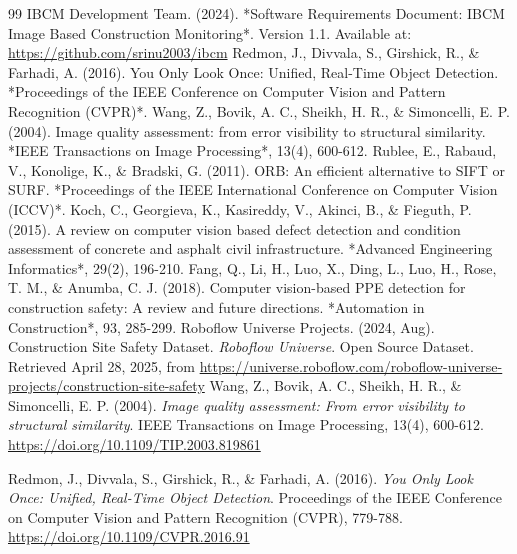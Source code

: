 \documentclass[12pt,a4paper]{report}
\begin{document}
% 
\renewcommand{\bibname}{References} %
\begin{thebibliography}{99}
     IBCM Development Team. (2024). *Software Requirements Document: IBCM Image Based Construction Monitoring*. Version 1.1. Available at: \url{https://github.com/srinu2003/ibcm}
     Redmon, J., Divvala, S., Girshick, R., \& Farhadi, A. (2016). You Only Look Once: Unified, Real-Time Object Detection. *Proceedings of the IEEE Conference on Computer Vision and Pattern Recognition (CVPR)*.
     Wang, Z., Bovik, A. C., Sheikh, H. R., \& Simoncelli, E. P. (2004). Image quality assessment: from error visibility to structural similarity. *IEEE Transactions on Image Processing*, 13(4), 600-612.
     Rublee, E., Rabaud, V., Konolige, K., \& Bradski, G. (2011). ORB: An efficient alternative to SIFT or SURF. *Proceedings of the IEEE International Conference on Computer Vision (ICCV)*.
     Koch, C., Georgieva, K., Kasireddy, V., Akinci, B., \& Fieguth, P. (2015). A review on computer vision based defect detection and condition assessment of concrete and asphalt civil infrastructure. *Advanced Engineering Informatics*, 29(2), 196-210.
     Fang, Q., Li, H., Luo, X., Ding, L., Luo, H., Rose, T. M., \& Anumba, C. J. (2018). Computer vision-based PPE detection for construction safety: A review and future directions. *Automation in Construction*, 93, 285-299.
     Roboflow Universe Projects. (2024, Aug). Construction Site Safety Dataset. \textit{Roboflow Universe}. Open Source Dataset. Retrieved April 28, 2025, from \url{https://universe.roboflow.com/roboflow-universe-projects/construction-site-safety}
    Wang, Z., Bovik, A. C., Sheikh, H. R., \& Simoncelli, E. P. (2004).
    \textit{Image quality assessment: From error visibility to structural similarity}.
    IEEE Transactions on Image Processing, 13(4), 600-612.
    \href{https://doi.org/10.1109/TIP.2003.819861}{https://doi.org/10.1109/TIP.2003.819861}

    Redmon, J., Divvala, S., Girshick, R., \& Farhadi, A. (2016).
    \textit{You Only Look Once: Unified, Real-Time Object Detection}.
    Proceedings of the IEEE Conference on Computer Vision and Pattern Recognition (CVPR), 779-788.
    \href{https://doi.org/10.1109/CVPR.2016.91}{https://doi.org/10.1109/CVPR.2016.91}


\end{thebibliography}
\end{document}
